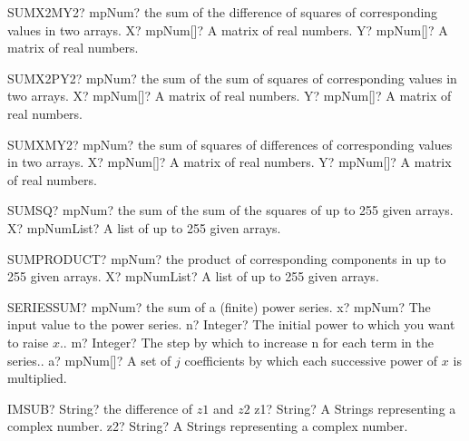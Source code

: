 \documentclass[12pt,a4paper,openany]{book}
\begin{document}
\begin{mpFunctionsExtract}
\mpWorksheetFunctionTwoNotImplemented
{SUMX2MY2? mpNum? the sum of the difference of squares of corresponding values in two arrays.}
{X? mpNum[]? A matrix of real numbers.}
{Y? mpNum[]? A matrix of real numbers.}
\end{mpFunctionsExtract}

\begin{mpFunctionsExtract}
\mpWorksheetFunctionTwoNotImplemented
{SUMX2PY2? mpNum? the sum of the sum of squares of corresponding values in two arrays.}
{X? mpNum[]? A matrix of real numbers.}
{Y? mpNum[]? A matrix of real numbers.}
\end{mpFunctionsExtract}

\begin{mpFunctionsExtract}
\mpWorksheetFunctionTwoNotImplemented
{SUMXMY2? mpNum? the sum of squares of differences of corresponding values in two arrays.}
{X? mpNum[]? A matrix of real numbers.}
{Y? mpNum[]? A matrix of real numbers.}
\end{mpFunctionsExtract}

\begin{mpFunctionsExtract}
\mpWorksheetFunctionOneNotImplemented
{SUMSQ? mpNum? the sum of the sum of the squares of up to 255 given arrays.}
{X? mpNumList? A list of up to 255 given arrays.}
\end{mpFunctionsExtract}

\begin{mpFunctionsExtract}
\mpWorksheetFunctionOneNotImplemented
{SUMPRODUCT? mpNum? the product of corresponding components in up to 255 given arrays.}
{X? mpNumList? A list of up to 255 given arrays.}
\end{mpFunctionsExtract}

\begin{mpFunctionsExtract}
\mpWorksheetFunctionFour
{SERIESSUM? mpNum? the sum of a (finite) power series.}
{x? mpNum? The input value to the power series.}
{n? Integer? The initial power to which you want to raise $x$..}
{m? Integer? The step by which to increase n for each term in the series..}
{a? mpNum[]? A set of $j$ coefficients by which each successive power of $x$ is multiplied.}
\end{mpFunctionsExtract}

\begin{mpFunctionsExtract}
\mpWorksheetFunctionTwoNotImplemented
{IMSUB? String? the difference of $z1$ and $z2$}
{z1? String? A Strings representing a complex number.}
{z2? String? A Strings representing a complex number.}
\end{mpFunctionsExtract}
\end{document}
